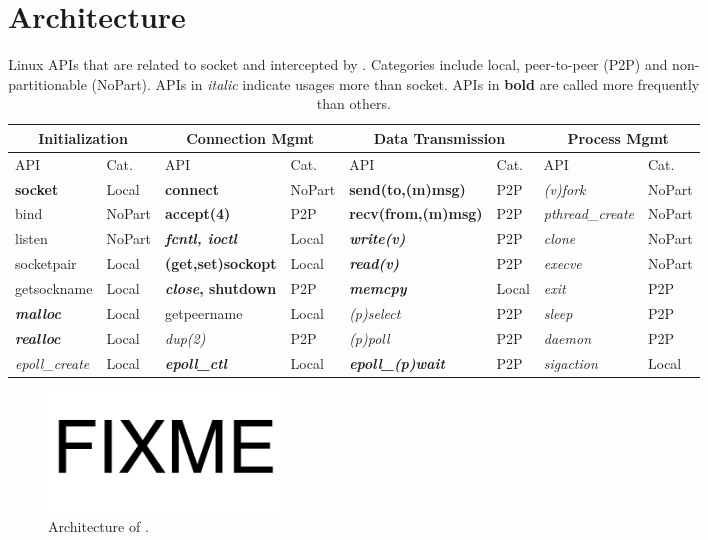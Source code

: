 \section{Architecture}
\label{sec:architecture}


\begin{table}[t]
	\centering
	\begin{tabular}{ll|ll|ll|ll}
		\hline
		\multicolumn{2}{c|}{Initialization} &
		\multicolumn{2}{c|}{Connection Mgmt} &
		\multicolumn{2}{c|}{Data Transmission} &
		\multicolumn{2}{c}{Process Mgmt} \\
		\hline
		API & Cat. &
		API & Cat. &
		API & Cat. &
		API & Cat. \\
		\hline
		\hline
		\textbf{socket} & Local &
		\textbf{connect} & NoPart &
		\textbf{send(to,(m)msg)} & P2P &
		\textit{(v)fork} & NoPart \\
		\hline
		bind & NoPart &
		\textbf{accept(4)} & P2P &
		\textbf{recv(from,(m)msg)} & P2P &
		\textit{pthread\_create} & NoPart \\
		\hline
		listen & NoPart &
		\textbf{\textit{fcntl, ioctl}} & Local &
		\textbf{\textit{write(v)}} & P2P &
		\textit{clone} & NoPart \\
		\hline
		socketpair & Local &
		\textbf{(get,set)sockopt} & Local &
		\textbf{\textit{read(v)}} & P2P &
		\textit{execve} & NoPart \\
		\hline
		getsockname  & Local &
		\textbf{\textit{close}, shutdown} & P2P &
		\textbf{\textit{memcpy}} & Local &
		\textit{exit} & P2P \\
		\hline
		\textbf{\textit{malloc}} & Local &
		getpeername & Local &
		\textit{(p)select} & P2P &
		\textit{sleep} & P2P \\
		\hline
		\textbf{\textit{realloc}} & Local &
		\textit{dup(2)} & P2P &
		\textit{(p)poll} & P2P &
		\textit{daemon} & P2P \\
		\hline
		\textit{epoll\_create} & Local &
		\textbf{\textit{epoll\_ctl}} & Local &
		\textbf{\textit{epoll\_(p)wait}} & P2P &
		\textit{sigaction} & Local \\
		\hline
	\end{tabular}
	\caption{Linux APIs that are related to socket and intercepted by \libipc{}. Categories include local, peer-to-peer (P2P) and non-partitionable (NoPart). APIs in \textit{italic} indicate usages more than socket. APIs in \textbf{bold} are called more frequently than others.}
	\label{tab:socket-api}
\end{table}

\begin{figure}[t]
	\centering
	\includegraphics[width=0.3\textwidth]{images/fixme}
	\caption{Architecture of \sys{}.}
	\label{fig:architecture}
\end{figure}


